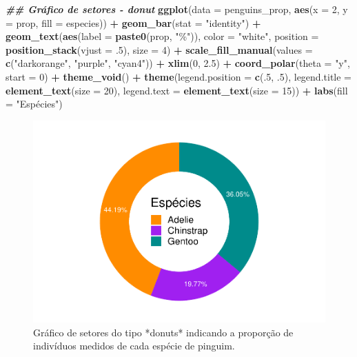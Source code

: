 \documentclass[
]{article}
\newenvironment{Shaded}{\begin{snugshade}}{\end{snugshade}}
\newcommand{\AttributeTok}[1]{\textcolor[rgb]{0.13,0.29,0.53}{#1}}
\newcommand{\DecValTok}[1]{\textcolor[rgb]{0.00,0.00,0.81}{#1}}
\newcommand{\DocumentationTok}[1]{\textcolor[rgb]{0.56,0.35,0.01}{\textbf{\textit{#1}}}}
\newcommand{\FloatTok}[1]{\textcolor[rgb]{0.00,0.00,0.81}{#1}}
\newcommand{\FunctionTok}[1]{\textcolor[rgb]{0.13,0.29,0.53}{\textbf{#1}}}
\newcommand{\NormalTok}[1]{#1}
\newcommand{\SpecialCharTok}[1]{\textcolor[rgb]{0.81,0.36,0.00}{\textbf{#1}}}
\newcommand{\StringTok}[1]{\textcolor[rgb]{0.31,0.60,0.02}{#1}}
\begin{document}
\begin{Shaded}
\begin{Highlighting}[]
\DocumentationTok{\#\# Gráfico de setores {-} donut}
\FunctionTok{ggplot}\NormalTok{(}\AttributeTok{data =}\NormalTok{ penguins\_prop, }\FunctionTok{aes}\NormalTok{(}\AttributeTok{x =} \DecValTok{2}\NormalTok{, }\AttributeTok{y =}\NormalTok{ prop, }\AttributeTok{fill =}\NormalTok{ especies)) }\SpecialCharTok{+}
    \FunctionTok{geom\_bar}\NormalTok{(}\AttributeTok{stat =} \StringTok{"identity"}\NormalTok{) }\SpecialCharTok{+}
    \FunctionTok{geom\_text}\NormalTok{(}\FunctionTok{aes}\NormalTok{(}\AttributeTok{label =} \FunctionTok{paste0}\NormalTok{(prop, }\StringTok{"\%"}\NormalTok{)), }\AttributeTok{color =} \StringTok{"white"}\NormalTok{,}
              \AttributeTok{position =} \FunctionTok{position\_stack}\NormalTok{(}\AttributeTok{vjust =}\NormalTok{ .}\DecValTok{5}\NormalTok{), }\AttributeTok{size =} \DecValTok{4}\NormalTok{) }\SpecialCharTok{+}
    \FunctionTok{scale\_fill\_manual}\NormalTok{(}\AttributeTok{values =} \FunctionTok{c}\NormalTok{(}\StringTok{"darkorange"}\NormalTok{, }\StringTok{"purple"}\NormalTok{, }\StringTok{"cyan4"}\NormalTok{)) }\SpecialCharTok{+}
    \FunctionTok{xlim}\NormalTok{(}\DecValTok{0}\NormalTok{, }\FloatTok{2.5}\NormalTok{) }\SpecialCharTok{+}
    \FunctionTok{coord\_polar}\NormalTok{(}\AttributeTok{theta =} \StringTok{"y"}\NormalTok{, }\AttributeTok{start =} \DecValTok{0}\NormalTok{) }\SpecialCharTok{+}
    \FunctionTok{theme\_void}\NormalTok{() }\SpecialCharTok{+}
    \FunctionTok{theme}\NormalTok{(}\AttributeTok{legend.position =} \FunctionTok{c}\NormalTok{(.}\DecValTok{5}\NormalTok{, .}\DecValTok{5}\NormalTok{),}
          \AttributeTok{legend.title =} \FunctionTok{element\_text}\NormalTok{(}\AttributeTok{size =} \DecValTok{20}\NormalTok{),}
          \AttributeTok{legend.text =} \FunctionTok{element\_text}\NormalTok{(}\AttributeTok{size =} \DecValTok{15}\NormalTok{)) }\SpecialCharTok{+}
    \FunctionTok{labs}\NormalTok{(}\AttributeTok{fill =} \StringTok{"Espécies"}\NormalTok{)}
\end{Highlighting}
\end{Shaded}

\begin{figure}
\includegraphics[width=0.75\linewidth,height=0.75\textheight]{epr_files/figure-latex/fig-donut-1} \caption{Gráfico de setores do tipo *donuts* indicando a proporção de indivíduos medidos de cada espécie de pinguim.}\label{fig:fig-donut}
\end{figure}
\end{document}
